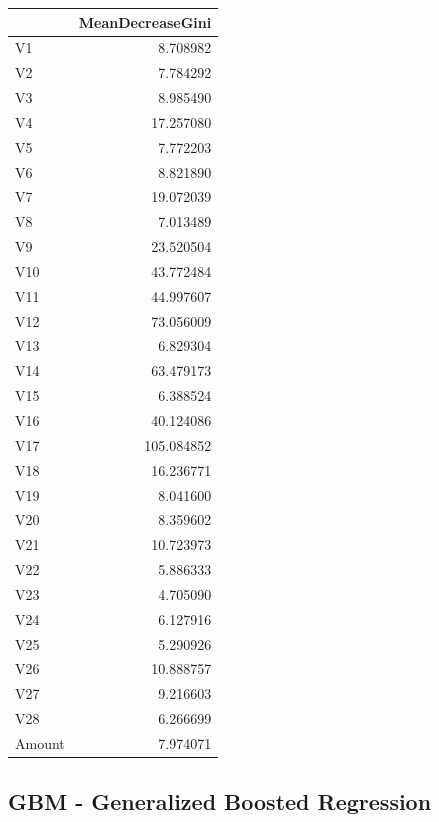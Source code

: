 \documentclass[]{article}
\begin{document}
\begin{table}[H]
\centering\begingroup\fontsize{10}{12}\selectfont

\begin{tabular}{l|r}
\hline
  & MeanDecreaseGini\\
\hline
V1 & 8.708982\\
\hline
V2 & 7.784292\\
\hline
V3 & 8.985490\\
\hline
V4 & 17.257080\\
\hline
V5 & 7.772203\\
\hline
V6 & 8.821890\\
\hline
V7 & 19.072039\\
\hline
V8 & 7.013489\\
\hline
V9 & 23.520504\\
\hline
V10 & 43.772484\\
\hline
V11 & 44.997607\\
\hline
V12 & 73.056009\\
\hline
V13 & 6.829304\\
\hline
V14 & 63.479173\\
\hline
V15 & 6.388524\\
\hline
V16 & 40.124086\\
\hline
V17 & 105.084852\\
\hline
V18 & 16.236771\\
\hline
V19 & 8.041600\\
\hline
V20 & 8.359602\\
\hline
V21 & 10.723973\\
\hline
V22 & 5.886333\\
\hline
V23 & 4.705090\\
\hline
V24 & 6.127916\\
\hline
V25 & 5.290926\\
\hline
V26 & 10.888757\\
\hline
V27 & 9.216603\\
\hline
V28 & 6.266699\\
\hline
Amount & 7.974071\\
\hline
\end{tabular}
\endgroup{}
\end{table}
\newpage

\hypertarget{gbm---generalized-boosted-regression}{%
\subsection{GBM - Generalized Boosted
Regression}\label{gbm---generalized-boosted-regression}}
\end{document}
